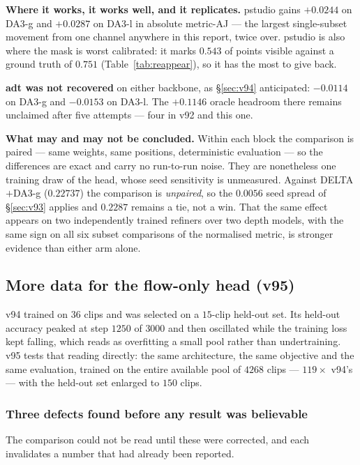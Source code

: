 \documentclass[11pt,a4paper]{article}
\begin{document}
\textbf{Where it works, it works well, and it replicates.} pstudio gains $+0.0244$ on DA3-g and
$+0.0287$ on DA3-l in absolute metric-AJ --- the largest single-subset movement from one channel
anywhere in this report, twice over. pstudio is also where the mask is worst calibrated: it marks
$0.543$ of points visible against a ground truth of $0.751$ (Table~\ref{tab:reappear}), so it has
the most to give back.

\textbf{adt was not recovered} on either backbone, as \S\ref{sec:v94} anticipated: $-0.0114$ on
DA3-g and $-0.0153$ on DA3-l. The $+0.1146$ oracle headroom there remains unclaimed after five
attempts --- four in v92 and this one.

\textbf{What may and may not be concluded.} Within each block the comparison is paired --- same
weights, same positions, deterministic evaluation --- so the differences are exact and carry no
run-to-run noise. They are nonetheless one training draw of the head, whose seed sensitivity is
unmeasured. Against DELTA$+$DA3-g ($0.22737$) the comparison is \emph{unpaired}, so the $0.0056$
seed spread of \S\ref{sec:v93} applies and $0.2287$ remains a tie, not a win. That the same
effect appears on two independently trained refiners over two depth models, with the same sign on
all six subset comparisons of the normalised metric, is stronger evidence than either arm alone.

\subsection{More data for the flow-only head (v95)}
\label{sec:v95}

v94 trained on $36$ clips and was selected on a $15$-clip held-out set. Its held-out accuracy
peaked at step $1250$ of $3000$ and then oscillated while the training loss kept falling, which
reads as overfitting a small pool rather than undertraining. v95 tests that reading directly: the
same architecture, the same objective and the same evaluation, trained on the entire available
pool of $4268$ clips --- $119\times$ v94's --- with the held-out set enlarged to $150$ clips.

\subsubsection{Three defects found before any result was believable}
The comparison could not be read until these were corrected, and each invalidates a number that
had already been reported.
\end{document}
